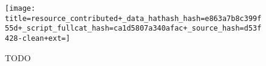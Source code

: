 \begin{figure}[!htbp]
\begin{center}

\texttt{[image: title=resource\_contributed+\_data\_hathash\_hash=e863a7b8c399f55d+\_script\_fullcat\_hash=ca1d5807a340afac+\_source\_hash=d53f428-clean+ext=]}
\caption{
TODO
}
\label{fig:resource_contributed}
\end{center}
\end{figure}
